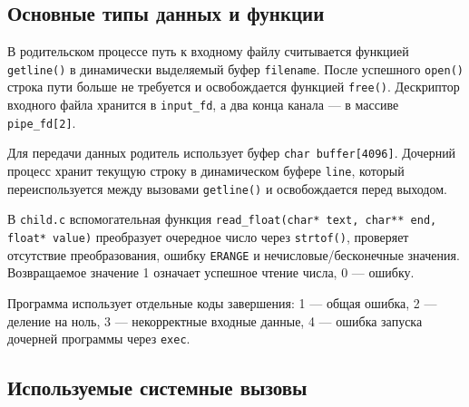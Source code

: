 \documentclass[12pt, a4paper]{article}
\begin{document}
\subsection{Основные типы данных и функции}

В родительском процессе путь к входному файлу считывается функцией
\texttt{getline()} в динамически выделяемый буфер \texttt{filename}. После
успешного \texttt{open()} строка пути больше не требуется и освобождается функцией
\texttt{free()}. Дескриптор входного файла хранится в \texttt{input\_fd}, а два
конца канала --- в массиве \texttt{pipe\_fd[2]}.

Для передачи данных родитель использует буфер \texttt{char buffer[4096]}.
Дочерний процесс хранит текущую строку в динамическом буфере \texttt{line}, который
переиспользуется между вызовами \texttt{getline()} и освобождается перед выходом.

В \texttt{child.c} вспомогательная функция
\texttt{read\_float(char* text, char** end, float* value)} преобразует очередное
число через \texttt{strtof()}, проверяет отсутствие преобразования, ошибку
\texttt{ERANGE} и нечисловые/бесконечные значения. Возвращаемое значение 1 означает
успешное чтение числа, 0 --- ошибку.

Программа использует отдельные коды завершения: 1 --- общая ошибка, 2 --- деление
на ноль, 3 --- некорректные входные данные, 4 --- ошибка запуска дочерней программы
через \texttt{exec}.

\subsection{Используемые системные вызовы}
\end{document}
